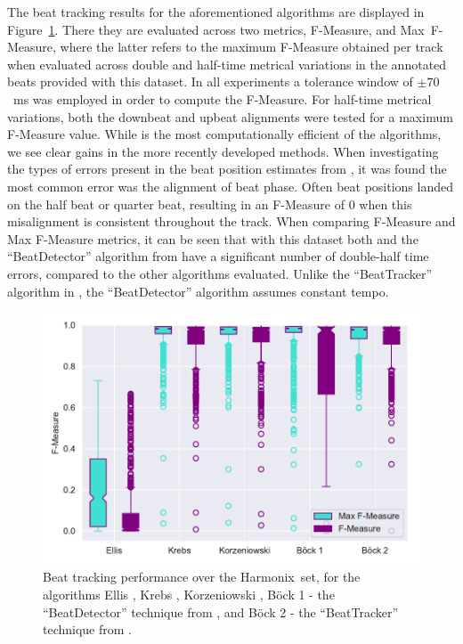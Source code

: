 \documentclass{article}
\newcommand{\setName}{Harmonix}
\begin{document}
The beat tracking results for the aforementioned algorithms are displayed in Figure~\ref{fig:beat_results}. There they are evaluated across two metrics,
F-Measure, and Max~F-Measure, where the latter refers to the maximum F-Measure obtained per track when evaluated across double and half-time metrical variations
in the annotated beats provided with this dataset. In all experiments a tolerance window of  $\pm 70$~ms was employed in order to compute the F-Measure. For half-time metrical variations, both the downbeat and upbeat alignments were tested for a maximum F-Measure
value. While \cite{Ellis2007} is the most computationally efficient of the algorithms, we see clear gains in the more recently developed methods. When investigating the types
of errors present in the beat position estimates from \cite{Ellis2007}, it was found the most common error was the alignment of beat phase. Often beat positions landed
on the half beat or quarter beat, resulting in an F-Measure of 0 when this misalignment is consistent throughout the track.
When comparing F-Measure and Max F-Measure metrics, it can be seen that with 
this dataset both \cite{Ellis2007} and the ``BeatDetector'' algorithm from \cite{Bock2011} have a significant number of double-half time errors, compared to the other algorithms evaluated.
Unlike the ``BeatTracker'' algorithm in \cite{Bock2011}, the ``BeatDetector'' algorithm assumes constant tempo.

\begin{figure}
    \centerline{\includegraphics[width=\columnwidth]{figs/2019_04_09_19_15_00_Beat_TrackiMax_F-Measure.pdf}}
    \caption{Beat tracking performance over the \setName~set, for the algorithms Ellis \cite{Ellis2007}, Krebs \cite{Krebs2015}, Korzeniowski \cite{Korzeniowski2014}, B{\"o}ck 1 - the ``BeatDetector'' technique from \cite{Bock2011}, and B{\"o}ck 2 - the ``BeatTracker'' technique from \cite{Bock2011}.}
    \label{fig:beat_results}
\end{figure}
\end{document}
